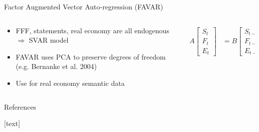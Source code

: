 \documentclass{beamer}
\begin{document}
\begin{frame}{Factor Augmented Vector Auto-regression (FAVAR)}
	
	\begin{columns}
		\begin{column}{0.5\textwidth}
			\begin{itemize}
				\item FFF, statements, real economy are all endogenous $\Rightarrow$ SVAR model
				\item FAVAR uses PCA to preserve degrees of freedom (e.g. Bernanke et al. 2004)
				\item Use for real economy semantic data
			\end{itemize}
		\end{column}
		\begin{column}{0.5\textwidth}
			\begin{align}
			A\begin{bmatrix}
			S_t\\F_t\\E_t
			\end{bmatrix} &=
			B\begin{bmatrix}
			S_{t-1}\\F_{t-1}\\E_{t-1}
			\end{bmatrix} + \epsilon_t \nonumber
			\end{align}
		\end{column}
	\end{columns}
\end{frame}


\begin{frame}{References}
\nocite{gurkaynak2005actions}
\nocite{campbell2012macroeconomic}
\nocite{le2014distributed}
\nocite{mikolov2013efficient}
\nocite{bernanke2005measuring}

[text]



\end{frame}
\end{document}
